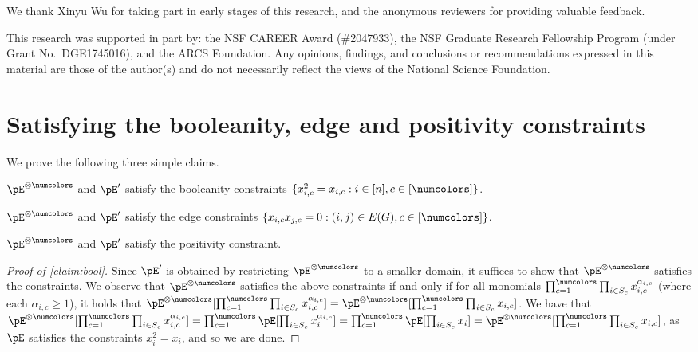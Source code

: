 We thank Xinyu Wu for taking part in early stages of this research, and the anonymous reviewers for providing valuable feedback.

This research was supported in part by:
the NSF CAREER Award (\#2047933),
the NSF Graduate Research Fellowship Program (under Grant No.\ DGE1745016),
and
the ARCS Foundation.
Any opinions, findings, and conclusions or recommendations expressed in this material are those of the author(s) and do not necessarily reflect the views of the National Science Foundation.














\appendix


\section{Satisfying the booleanity, edge and positivity constraints}
\label{appendix:edgepsd}
We prove the following three simple claims.

\begin{claim}
\label{claim:bool}
$\pE^{\otimes \numcolors}$ and $\pE'$ satisfy the booleanity constraints $\{x_{i,c}^2 =  x_{i,c} : i \in [n], c \in [\numcolors]\}$.
\end{claim}
\begin{claim}
\label{claim:edge}
$\pE^{\otimes \numcolors}$ and $\pE'$ satisfy the edge constraints $\{x_{i,c} x_{j,c} = 0 : (i,j) \in E(G), c \in [\numcolors]\}$.
\end{claim}

\begin{claim}
\label{claim:psd}
$\pE^{\otimes \numcolors}$ and $\pE'$ satisfy the positivity constraint.
\end{claim}

\begin{proof}[Proof of \cref{claim:bool}]
Since $\pE'$ is obtained by restricting $\pE^{\otimes \numcolors}$ to a smaller domain, it suffices to show that $\pE^{\otimes \numcolors}$ satisfies the constraints. We observe that $\pE^{\otimes \numcolors}$ satisfies the above constraints if and only if for all monomials $\prod_{c = 1}^\numcolors \prod_{i \in S_c} x_{i,c}^{\alpha_{i,c}}$ (where each $\alpha_{i,c} \geq 1$), it holds that $\pE^{\otimes \numcolors}[\prod_{c = 1}^\numcolors \prod_{i \in S_c} x_{i,c}^{\alpha_{i,c}}] = \pE^{\otimes \numcolors}[\prod_{c = 1}^\numcolors \prod_{i \in S_c} x_{i,c}]$. We have that $\pE^{\otimes \numcolors}[\prod_{c = 1}^\numcolors \prod_{i \in S_c} x_{i,c}^{\alpha_{i,c}}] = \prod_{c = 1}^\numcolors \pE[\prod_{i \in S_c} x_{i}^{\alpha_{i,c}}] = \prod_{c = 1}^\numcolors \pE[\prod_{i \in S_c} x_{i}] = \pE^{\otimes \numcolors}[\prod_{c = 1}^\numcolors \prod_{i \in S_c} x_{i,c}]$, as $\pE$ satisfies the constraints $x_i^2 = x_i$, and so we are done.
\end{proof}

